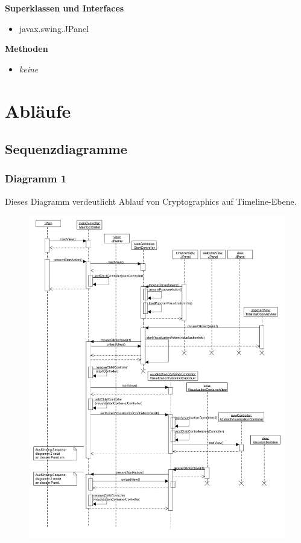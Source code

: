 \documentclass{article}
\begin{document}
      \textbf{Superklassen und Interfaces}
      \begin{itemize}
        \item javax.swing.JPanel
      \end{itemize}

      \textbf{Methoden}
      \begin{itemize}
        \item \textit{keine}
      \end{itemize}

\section{Abläufe}

\subsection{Sequenzdiagramme}
\subsubsection{Diagramm 1}
	Dieses Diagramm verdeutlicht Ablauf von Cryptographics auf Timeline-Ebene.
	\begin{figure}[H]
        \centering
        \includegraphics[height=0.9\textheight]{resources/sequenceDiagram01}
      \end{figure}
      
\end{document}
